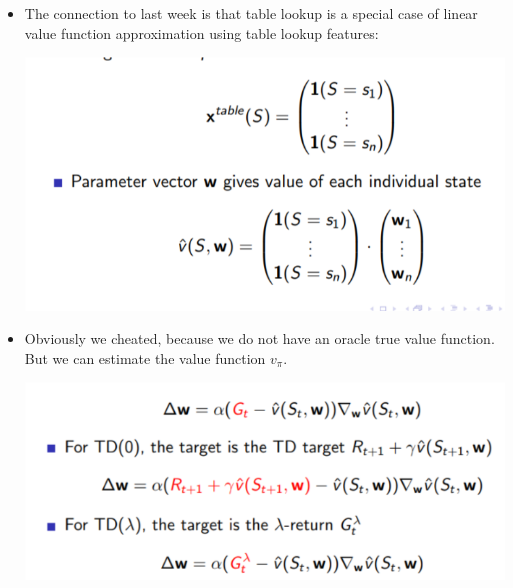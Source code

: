 \documentclass[a4paper]{article}
\begin{document}
\begin{itemize}
    \item The connection to last week is that table lookup is a special case of linear value function approximation using table lookup features: 
     \begin{center}
    \includegraphics[width = \textwidth]{images/featuretable.png}
    \end{center}
    \item Obviously we cheated, because we do not have an oracle true value function. But we can estimate the value function $v_{\pi}$. 
     \begin{center}
    \includegraphics[width = \textwidth]{images/approx.png}
    \end{center}
    

\end{itemize}
\end{document}
